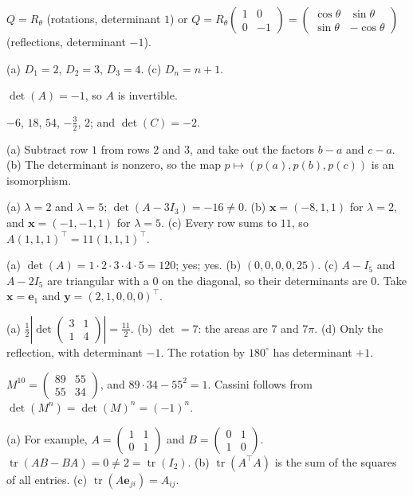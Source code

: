 \documentclass[11pt]{article}
\DeclareMathOperator{\tr}{tr}
\begin{document}
\begin{description}[leftmargin=0pt, itemsep=0.3em]
    \item[\ref{pr:orthogonal2}.] $Q = R_\theta$ (rotations, determinant $1$) or $Q = R_\theta \begin{pmatrix} 1 & 0 \\ 0 & -1 \end{pmatrix} = \begin{pmatrix} \cos\theta & \sin\theta \\ \sin\theta & -\cos\theta \end{pmatrix}$ (reflections, determinant $-1$).
    \item[\ref{pr:tridiagonal}.] (a) $D_1 = 2$, $D_2 = 3$, $D_3 = 4$. (c) $D_n = n + 1$.
    \item[\ref{pr:det4}.] $\det(A) = -1$, so $A$ is invertible.
    \item[\ref{pr:det-rules}.] $-6$, $18$, $54$, $-\frac{3}{2}$, $2$; and $\det(C) = -2$.
    \item[\ref{pr:vandermonde}.] (a) Subtract row $1$ from rows $2$ and $3$, and take out the factors $b - a$ and $c - a$. (b) The determinant is nonzero, so the map $p \mapsto (p(a), p(b), p(c))$ is an isomorphism.
    \item[\ref{pr:lambda}.] (a) $\lambda = 2$ and $\lambda = 5$; $\det(A - 3I_3) = -16 \neq 0$. (b) $\mathbf{x} = (-8, 1, 1)$ for $\lambda = 2$, and $\mathbf{x} = (-1, -1, 1)$ for $\lambda = 5$. (c) Every row sums to $11$, so $A(1, 1, 1)^\top = 11 (1, 1, 1)^\top$.
    \item[\ref{pr:upper5}.] (a) $\det(A) = 1 \cdot 2 \cdot 3 \cdot 4 \cdot 5 = 120$; yes; yes. (b) $(0, 0, 0, 0, 25)$. (c) $A - I_5$ and $A - 2I_5$ are triangular with a $0$ on the diagonal, so their determinants are $0$. Take $\mathbf{x} = \mathbf{e}_1$ and $\mathbf{y} = (2, 1, 0, 0, 0)^\top$.
    \item[\ref{pr:area}.] (a) $\frac{1}{2}\left|\det \begin{pmatrix} 3 & 1 \\ 1 & 4 \end{pmatrix}\right| = \frac{11}{2}$. (b) $\det = 7$: the areas are $7$ and $7\pi$. (d) Only the reflection, with determinant $-1$. The rotation by $180^\circ$ has determinant $+1$.
    \item[\ref{pr:fibonacci}.] $M^{10} = \begin{pmatrix} 89 & 55 \\ 55 & 34 \end{pmatrix}$, and $89 \cdot 34 - 55^2 = 1$. Cassini follows from $\det(M^n) = \det(M)^n = (-1)^n$.
    \item[\ref{pr:trace}.] (a) For example, $A = \begin{pmatrix} 1 & 1 \\ 0 & 1 \end{pmatrix}$ and $B = \begin{pmatrix} 0 & 1 \\ 1 & 0 \end{pmatrix}$. $\tr(AB - BA) = 0 \neq 2 = \tr(I_2)$. (b) $\tr(A^\top A)$ is the sum of the squares of all entries. (c) $\tr(A\mathbf{e}_{ji}) = A_{ij}$.

\end{description}
\end{document}
